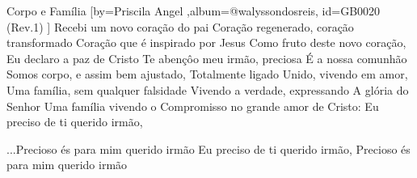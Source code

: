 \beginsong
{Corpo e Família %
}[by={Priscila Angel %
},album={@walyssondosreis},
id={GB0020 %
(Rev.1) %
}]
\beginverse
Recebi um novo coração do pai
Coração regenerado, coração transformado
Coração que é inspirado por Jesus
\endverse
\beginverse
Como fruto deste novo coração,
Eu declaro a paz de Cristo 
Te abençôo meu irmão, preciosa
É a nossa comunhão
\endverse
\beginchorus
Somos corpo, e assim bem ajustado,
Totalmente ligado
Unido, vivendo em amor,
Uma família, sem qualquer falsidade
Vivendo a verdade, expressando
A glória do Senhor
Uma família vivendo o 
Compromisso no grande amor de Cristo:
Eu preciso de ti querido irmão,

\endchorus
{}
\beginverse
...Precioso és para mim querido irmão
Eu preciso de ti querido irmão,
Precioso és para mim querido irmão
\endverse

